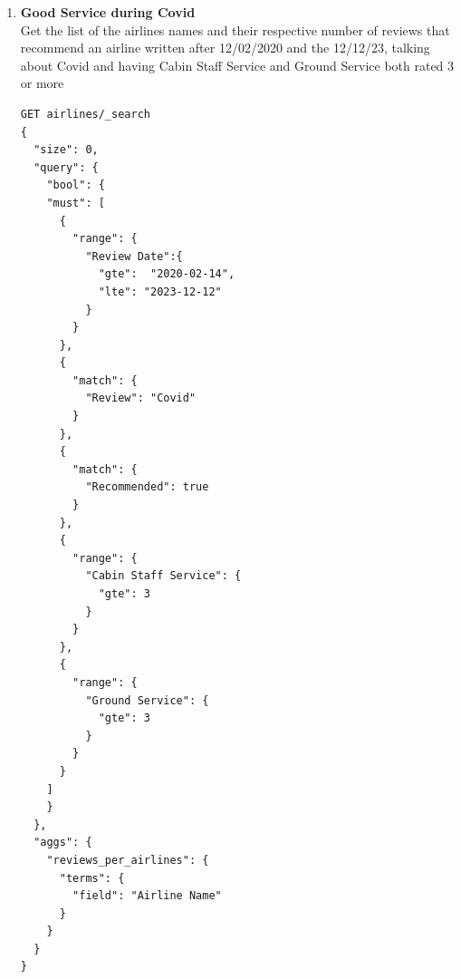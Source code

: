 \documentclass{Configuration_Files/PoliMi3i_thesis}
\begin{document}
\begin{enumerate}
    \item \textbf{Good Service during Covid}\\
    Get the list of the airlines names and their respective number of reviews that recommend an airline written after 12/02/2020 and the 12/12/23, talking about Covid and having Cabin Staff Service and Ground Service both rated 3 or more
\begin{verbatim}
GET airlines/_search
{
  "size": 0,
  "query": {
    "bool": {
    "must": [
      {
        "range": {
          "Review Date":{
            "gte":  "2020-02-14",
            "lte": "2023-12-12"
          }
        }
      },
      {
        "match": {
          "Review": "Covid"
        }
      },
      {
        "match": {
          "Recommended": true
        }
      },
      {
        "range": {
          "Cabin Staff Service": {
            "gte": 3
          }
        }
      }, 
      {
        "range": {
          "Ground Service": {
            "gte": 3
          }
        }
      }
    ]
    }
  },
  "aggs": {
    "reviews_per_airlines": {
      "terms": {
        "field": "Airline Name"
      }
    }
  }
}
\end{verbatim}
    


\end{enumerate}
\end{document}
